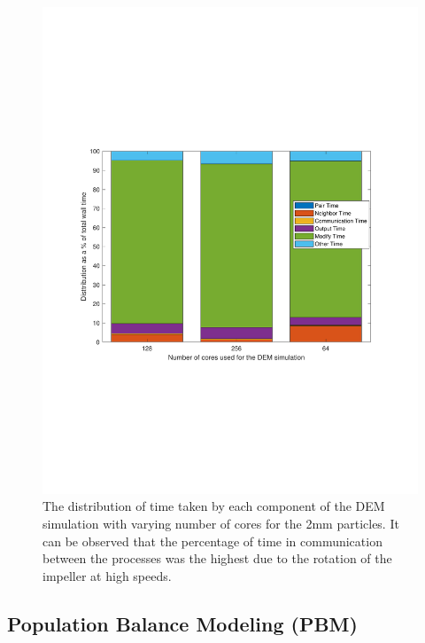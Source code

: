 \documentclass[preprint,11pt,authoryear]{elsarticle}
\begin{document}
\begin{figure}
\centering
\includegraphics[scale=0.75]{rslsts_DEM_profle_mtlb.pdf}
\caption{The distribution of time taken by each component of the DEM simulation with varying number of cores for the 2mm particles. It 
can be observed that the percentage of time in communication between the processes was the highest due to the rotation of the impeller 
at high speeds.}
\label{fig:rslts_DEM_percent_plot}
\end{figure}


\subsection{Population Balance Modeling (PBM)}
\end{document}
